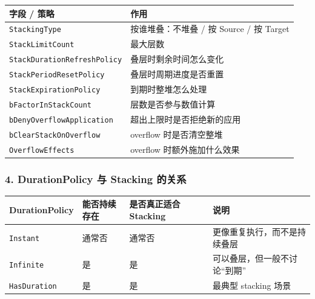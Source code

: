 \documentclass[CJKmath=true,10pt]{MyBook}
\begin{document}
\begin{longtable}{@{}p{}p{}@{}}
	\toprule
	\textbf{字段 / 策略} & \textbf{作用} \\
	\midrule
	\endhead
	
	\texttt{StackingType}
	&
	按谁堆叠：不堆叠 / 按 Source / 按 Target
	\\
	
	\texttt{StackLimitCount}
	&
	最大层数
	\\
	
	\texttt{StackDurationRefreshPolicy}
	&
	叠层时剩余时间怎么变化
	\\
	
	\texttt{StackPeriodResetPolicy}
	&
	叠层时周期进度是否重置
	\\
	
	\texttt{StackExpirationPolicy}
	&
	到期时整堆怎么处理
	\\
	
	\texttt{bFactorInStackCount}
	&
	层数是否参与数值计算
	\\
	
	\texttt{bDenyOverflowApplication}
	&
	超出上限时是否拒绝新的应用
	\\
	
	\texttt{bClearStackOnOverflow}
	&
	overflow 时是否清空整堆
	\\
	
	\texttt{OverflowEffects}
	&
	overflow 时额外施加什么效果
	\\
	
	\bottomrule
\end{longtable}

\subsubsection{4. DurationPolicy 与 Stacking 的关系}

\begin{longtable}{@{}p{}p{}p{}p{}@{}}
	\toprule
	\textbf{DurationPolicy} & \textbf{能否持续存在} & \textbf{是否真正适合 Stacking} & \textbf{说明} \\
	\midrule
	\endhead
	
	\texttt{Instant}
	&
	通常否
	&
	通常否
	&
	更像重复执行，而不是持续叠层
	\\
	
	\texttt{Infinite}
	&
	是
	&
	是
	&
	可以叠层，但一般不讨论“到期”
	\\
	
	\texttt{HasDuration}
	&
	是
	&
	是
	&
	最典型 stacking 场景
	\\
	
	\bottomrule
\end{longtable}
\end{document}
